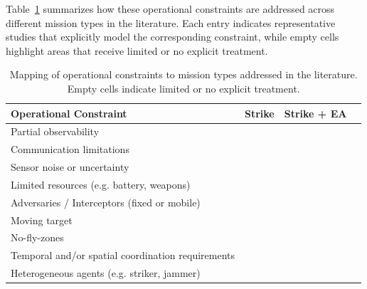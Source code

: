 Table~\ref{tab:mission_constraints_empty1} summarizes how these operational constraints are addressed across different mission types in the literature. Each entry indicates representative studies that explicitly model the corresponding constraint, while empty cells highlight areas that receive limited or no explicit treatment.

\begin{table}[htbp]
\centering
\caption{Mapping of operational constraints to mission types addressed in the literature. Empty cells indicate limited or no explicit treatment.}
\label{tab:mission_constraints_empty1}
\begin{tabular}{lccc}
\toprule
\textbf{Operational Constraint}
& \textbf{Strike}
& \textbf{Strike + EA} \\
\midrule
Partial observability 
& \cite{Wang2025CooperativeUAV, Jiang2025DDPGSwarmTaskPlanning}
& \cite{Fang2021CollaborativeCombat, Lee2023MUMTSEAD} \\

Communication limitations  
& \cite{Wang2025CooperativeUAV, Jiang2025DDPGSwarmTaskPlanning}
& \cite{Fang2021CollaborativeCombat, xu2025mdrl_uav_combat, Ran2023UAVIPPO} \\

Sensor noise or uncertainty   
& \cite{Jiang2025DDPGSwarmTaskPlanning} 
& \\

Limited resources (e.g. battery, weapons)
& 
& \cite{xu2025mdrl_uav_combat, Lee2023MUMTSEAD} \\

Adversaries / Interceptors (fixed or mobile)
& \cite{Wang2025CooperativeUAV}
& \cite{xu2025mdrl_uav_combat, yue2022uav_sead_hmarl, Fang2021CollaborativeCombat, Lee2023MUMTSEAD} \\

Moving target
& \cite{Wang2025CooperativeUAV, Jiang2025DDPGSwarmTaskPlanning}
& \cite{Fang2021CollaborativeCombat} \\

No-fly-zones 
& \cite{yuksek2021cooperative}
& \\

Temporal and/or spatial coordination requirements 
& \cite{yuksek2021cooperative}
& \cite{xu2025mdrl_uav_combat, Lee2023MUMTSEAD} \\

Heterogeneous agents (e.g. striker, jammer)
& \cite{Wang2025CooperativeUAV}
& \cite{yue2022uav_sead_hmarl, xu2025mdrl_uav_combat, Fang2021CollaborativeCombat, Lee2023MUMTSEAD} \\

\bottomrule
\end{tabular}
\end{table}

